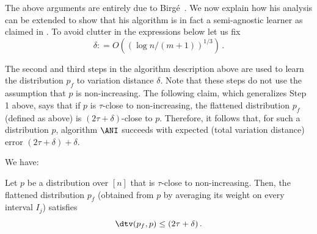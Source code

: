\medskip

The above arguments are entirely due to Birg{\'e}~\cite{Birge:87b}.
We now explain how his analysis can be extended to show that his algorithm is
in fact a semi-agnostic learner as claimed in .
To avoid clutter in the expressions below let us fix
\[
\delta: =O\left( ({\log n / (m+1)})^{1/3} \right)\,.
\]

The second and third steps in the algorithm description
above are used to learn the distribution $p_f$ to variation distance $\delta$.
Note that these steps do not use the assumption that $p$ is non-increasing.
The following claim, which generalizes Step 1 above, says that if $p$ is $\tau$-close to non-increasing,
the flattened distribution $p_f$ (defined as above) is $(2\tau+\delta)$-close to $p$.
Therefore, it follows that, for such a distribution $p$,
algorithm $\ANI$ succeeds with expected (total variation distance) error
$(2\tau+\delta)+\delta$.

\noindent We have:

\begin{claim}
Let $p$ be a distribution over $[n]$ that is $\tau$-close to non-increasing.
Then, the flattened distribution $p_f$ (obtained from $p$ by averaging its
weight on every interval $I_j$) satisfies
\[
\dtv(p_f,p) \leq (2\tau+\delta)\,.
\]
\end{claim}

